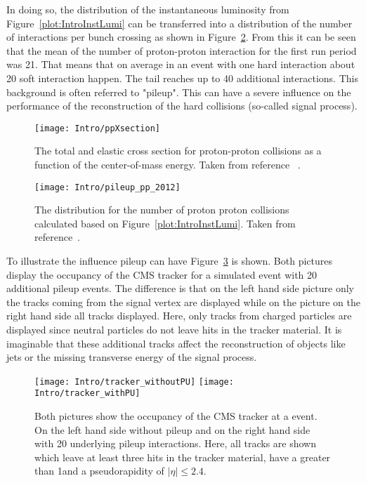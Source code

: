 In doing so, the distribution of the instantaneous luminosity from Figure~\ref{plot:IntroInstLumi} can be transferred into a distribution of the number of interactions per bunch crossing as shown in Figure~\ref{plot:IntroPileupDistr}. From this it can be seen that the mean of the number of proton-proton interaction for the first run period was 21. That means that on average in an event with one hard interaction about 20 soft interaction happen. The tail reaches up to 40 additional interactions. This background is often referred to "pileup". This can have a severe influence on the performance of the reconstruction of the hard collisions (so-called signal process).

\begin{figure}[!Hhtb]
  \centering
  \texttt{[image: Intro/ppXsection]}
  \caption[Total and elastic cross section for pp interactions]{The total and elastic cross section for proton-proton collisions as a function of the center-of-mass energy. Taken from reference ~.\label{plot:IntroTotalCross}}
\end{figure}

\begin{figure}[!Hhtb]
  \centering
  \texttt{[image: Intro/pileup\_pp\_2012]}
  \caption[Number of pp collisions]{The distribution for the number of proton proton collisions calculated based on Figure~\ref{plot:IntroInstLumi}. Taken from reference~. \label{plot:IntroPileupDistr}}
\end{figure}

To illustrate the influence pileup can have Figure~\ref{plot:IntroOccuTracker} is shown. Both pictures display the occupancy of the CMS tracker for a simulated \ttbar event with 20 additional pileup events. The difference is that on the left hand side picture only the tracks coming from the signal vertex are displayed while on the picture on the right hand side all tracks displayed. Here, only tracks from charged particles are displayed since neutral particles do not leave hits in the tracker material. It is imaginable that these additional tracks affect the reconstruction of objects like jets or the missing transverse energy of the signal process. 

\begin{figure}[!Hhtb]
  \centering
  \texttt{[image: Intro/tracker\_withoutPU]}
  \texttt{[image: Intro/tracker\_withPU]}
  \caption[Occupancy of the tracker with and without pileup]{Both pictures show the occupancy of the CMS tracker at a \ttbar event. On the left hand side without pileup and on the right hand side with 20 underlying pileup interactions. Here, all tracks are shown which leave at least three hits in the tracker material, have a \pt greater than 1\GeVc and a pseudorapidity of $\left|\eta\right|\leq2.4$. \label{plot:IntroOccuTracker}}
\end{figure}

